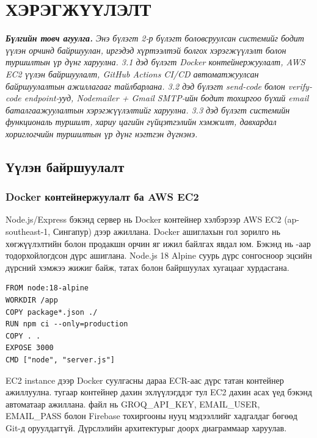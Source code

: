 
\chapter{ХЭРЭГЖҮҮЛЭЛТ}
\label{Chapter4}
\pagecolor{white}

\noindent\textit{\textbf{Бүлгийн товч агуулга.} Энэ бүлэгт 2-р бүлэгт боловсруулсан системийг бодит үүлэн орчинд байршуулан, иргэдэд хүртээлтэй болгох хэрэгжүүлэлт болон туршилтын үр дүнг харуулна. 3.1 дэд бүлэгт Docker контейнержуулалт, AWS EC2 үүлэн байршуулалт, GitHub Actions CI/CD автоматжуулсан байршуулалтын ажиллагааг тайлбарлана. 3.2 дэд бүлэгт send-code болон verify-code endpoint-ууд, Nodemailer + Gmail SMTP-ийн бодит тохиргоо бүхий email баталгаажуулалтын хэрэгжүүлэлтийг харуулна. 3.3 дэд бүлэгт системийн функциональ туршилт, хариу цагийн гүйцэтгэлийн хэмжилт, давхардал хориглогчийн туршилтын үр дүнг нэгтгэн дүгнэнэ.}

\bigskip


\section{Үүлэн байршуулалт}

\subsection*{Docker контейнержуулалт ба AWS EC2}

Node.js/Express бэкэнд сервер нь Docker контейнер хэлбэрээр AWS EC2 (ap-southeast-1, Сингапур) дээр ажиллана. Docker ашиглахын гол зорилго нь хөгжүүлэлтийн болон продакшн орчин яг ижил байлгах явдал юм. Бэкэнд нь -аар тодорхойлогдсон дүрс ашиглана. Node.js 18 Alpine суурь дүрс сонгосноор эцсийн дүрсний хэмжээ жижиг байж, татах болон байршуулах хугацааг хурдасгана.

\begin{lstlisting}[language={}, caption={backend/Dockerfile --- Node.js 18 Alpine суурьтай бэкэндийн дүрс}]
FROM node:18-alpine
WORKDIR /app
COPY package*.json ./
RUN npm ci --only=production
COPY . .
EXPOSE 3000
CMD ["node", "server.js"]
\end{lstlisting}

EC2 instance дээр Docker суулгасны дараа ECR-аас дүрс татан контейнер ажиллуулна.  тугаар контейнер дахин эхлүүлэгддэг тул EC2 дахин асах үед бэкэнд автоматаар ажиллана.  файл нь GROQ\_API\_KEY, EMAIL\_USER, EMAIL\_PASS болон Firebase тохиргооны нууц мэдээллийг хадгалдаг бөгөөд Git-д оруулдаггүй. Дүрслэлийн архитектурыг доорх диаграммаар харуулав.


